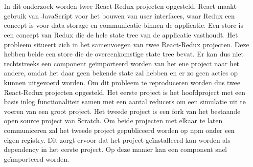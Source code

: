 
%
%

%



\chapter*{}

In dit onderzoek worden twee React-Redux projecten opgesteld. React maakt gebruik van JavaScript voor het bouwen van user interfaces, waar Redux een concept is voor data storage en communicatie binnen de applicatie. Een store is een concept van Redux die de hele state tree van de applicatie vasthoudt. Het probleem situeert zich in het samenvoegen van twee React-Redux projecten. Deze hebben beide een store die de overeenkomstige state tree bevat. Er kan dus niet rechtstreeks een component geïmporteerd worden van het ene project naar het andere, omdat het daar geen bekende state zal hebben en er zo geen acties op kunnen uitgevoerd worden. Om dit probleem te reproduceren worden dus twee React-Redux projecten opgesteld. Het eerste project is het hoofdproject met een basis inlog functionaliteit samen met een aantal reducers om een simulatie uit te voeren van een groot project. Het tweede project is een fork van het bestaande open source project van Scratch. Om beide projecten met elkaar te laten communiceren zal het tweede project gepubliceerd worden op npm onder een eigen registry. Dit zorgt ervoor dat het project geïnstalleerd kan worden als dependency in het eerste project. Op deze manier kan een component snel geïmporteerd worden. 

